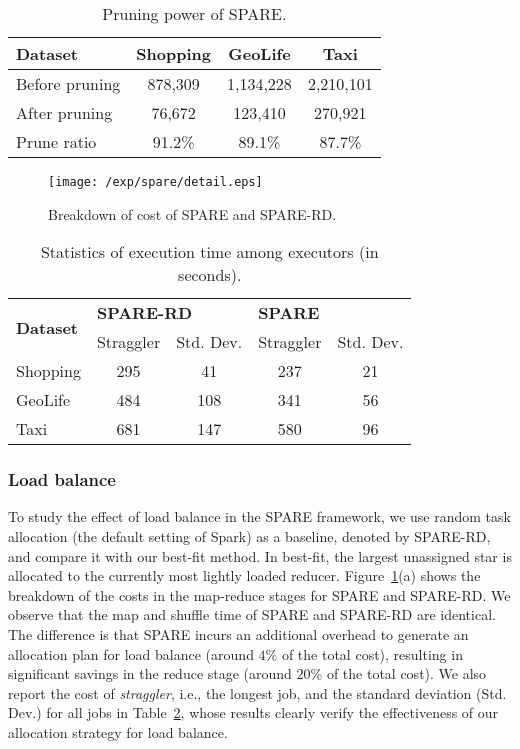 \begin{table}[h]
\centering
\begin{tabular}{|l|c|c|c|}
\hline 
\textbf{Dataset} & \textbf{Shopping} & \textbf{GeoLife} & \textbf{Taxi} \\ 
\hline 
Before pruning & 878,309 &  1,134,228 & 2,210,101 \\ 
\hline 
After pruning & 76,672 & 123,410 & 270,921 \\ 
\hline 
Prune ratio & 91.2\% & 89.1\% & 87.7\% \\ 
\hline 
\end{tabular} 

\caption{Pruning power of SPARE.}
\label{tbl:pruning}
\end{table}

\begin{figure}[h]
\centering
	  \texttt{[image: /exp/spare/detail.eps]}
    \caption{Breakdown of cost of SPARE and SPARE-RD.}
    \label{exp:wl}
\end{figure}

\begin{table}[h]
\centering \small
\begin{tabular}{|l|c|c|c|c|}
\hline
\multirow{2}{*}{\textbf{Dataset}} & \multicolumn{2}{l|}{\textbf{SPARE-RD}} & \multicolumn{2}{l|}{\textbf{SPARE}} \\ \cline{2-5} 
                         & Straggler        & Std. Dev.     & Straggler       & Std. Dev.      \\ \hline
Shopping                 & 295              & 41         & 237             & 21       \\ \hline
GeoLife                  & 484              & 108        & 341             & 56       \\ \hline
Taxi                     & 681              & 147        & 580             & 96       \\ \hline
\end{tabular}
  \caption{Statistics of execution time among executors (in seconds).}
  \label{tbl:strags}
\end{table}

\subsubsection{Load balance}
To study the effect of load balance in the SPARE framework, we use random task allocation (the default setting of Spark) as a baseline, denoted by SPARE-RD, and compare it with our best-fit method. In best-fit, the largest unassigned star is allocated to the currently most lightly loaded reducer.
Figure~\ref{exp:wl}(a) shows the breakdown of the costs in the map-reduce stages for SPARE and SPARE-RD. We observe that the map and shuffle time of SPARE and SPARE-RD are identical. The difference is that SPARE incurs an additional overhead to generate an allocation plan for load balance (around $4\%$ of the total cost), resulting in significant savings in the reduce stage (around $20\%$ of the total cost). We also report the cost of \emph{straggler}, i.e., the longest job, and the standard deviation (Std. Dev.) for all jobs in Table~\ref{tbl:strags}, whose results clearly verify the effectiveness of our allocation strategy for load balance.

